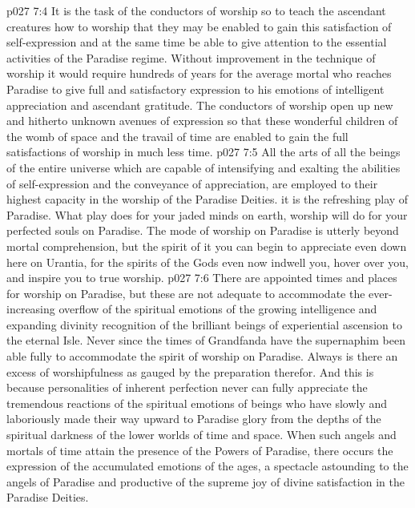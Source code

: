 \vs p027 7:4 \pc It is the task of the conductors of worship so to teach the ascendant creatures how to worship that they may be enabled to gain this satisfaction of self\hyp{}expression and at the same time be able to give attention to the essential activities of the Paradise regime. Without improvement in the technique of worship it would require hundreds of years for the average mortal who reaches Paradise to give full and satisfactory expression to his emotions of intelligent appreciation and ascendant gratitude. The conductors of worship open up new and hitherto unknown avenues of expression so that these wonderful children of the womb of space and the travail of time are enabled to gain the full satisfactions of worship in much less time.
\vs p027 7:5 All the arts of all the beings of the entire universe which are capable of intensifying and exalting the abilities of self\hyp{}expression and the conveyance of appreciation, are employed to their highest capacity in the worship of the Paradise Deities.  it is the refreshing play of Paradise. What play does for your jaded minds on earth, worship will do for your perfected souls on Paradise. The mode of worship on Paradise is utterly beyond mortal comprehension, but the spirit of it you can begin to appreciate even down here on Urantia, for the spirits of the Gods even now indwell you, hover over you, and inspire you to true worship.
\vs p027 7:6 There are appointed times and places for worship on Paradise, but these are not adequate to accommodate the ever\hyp{}increasing overflow of the spiritual emotions of the growing intelligence and expanding divinity recognition of the brilliant beings of experiential ascension to the eternal Isle. Never since the times of Grandfanda have the supernaphim been able fully to accommodate the spirit of worship on Paradise. Always is there an excess of worshipfulness as gauged by the preparation therefor. And this is because personalities of inherent perfection never can fully appreciate the tremendous reactions of the spiritual emotions of beings who have slowly and laboriously made their way upward to Paradise glory from the depths of the spiritual darkness of the lower worlds of time and space. When such angels and mortals of time attain the presence of the Powers of Paradise, there occurs the expression of the accumulated emotions of the ages, a spectacle astounding to the angels of Paradise and productive of the supreme joy of divine satisfaction in the Paradise Deities.
